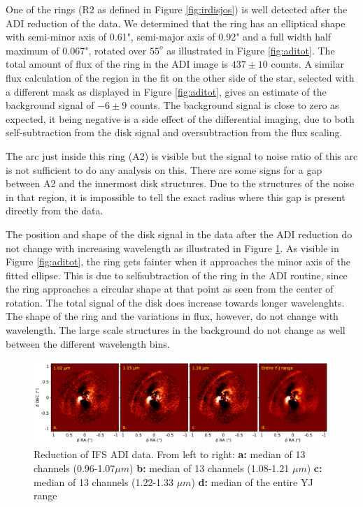 \documentclass[twoside,single,12pt]{lion-msc}
\begin{document}
One of the rings (R2 as defined in Figure \ref{fig:irdisjos}) is well detected after the ADI reduction of the data. We determined that the ring has an elliptical shape with semi-minor axis of 0.61", semi-major axis of 0.92" and a full width half maximum of 0.067", rotated over $55^o$ as illustrated in Figure \ref{fig:aditot}. The total amount of flux of the ring in the ADI image is $437\pm 10$ counts. A similar flux calculation of the region in the fit on the other side of the star, selected with a different mask as displayed in Figure \ref{fig:aditot}, gives an estimate of the background signal of $-6\pm 9$ counts. The background signal is close to zero as expected, it being negative is a side effect of the differential imaging, due to both self-subtraction from the disk signal and oversubtraction from the flux scaling. 
\bigskip

The arc just inside this ring (A2) is visible but the signal to noise ratio of this arc is not sufficient to do any analysis on this. There are some signs for a gap between A2 and the innermost disk structures. Due to the structures of the noise in that region, it is impossible to tell the exact radius where this gap is present directly from the data. 
\bigskip

The position and shape of the disk signal in the data after the ADI reduction do not change with increasing wavelength as illustrated in Figure \ref{fig:ADIcolor}. As visible in Figure \ref{fig:aditot}, the ring gets fainter when it approaches the minor axis of the fitted ellipse. This is due to selfsubtraction of the ring in the ADI routine, since the ring approaches a circular shape at that point as seen from the center of rotation. The total signal of the disk does increase towards longer wavelenghts. The shape of the ring and the variations in flux, however, do not change with wavelength. The large scale structures in the background do not change as well between the different wavelength bins.

\begin{figure}[htb]
\centering
\includegraphics[trim={0cm 0cm 0cm 0cm},clip,width = \textwidth]{ADIwavelplot}
\caption{Reduction of IFS ADI data. From left to right: \textbf{a:} median of 13 channels (0.96-1.07$\mu m$) \textbf{b:} median of 13 channels (1.08-1.21 $\mu m$) \textbf{c:} median of 13 channels (1.22-1.33 $\mu m$) \textbf{d:} median of the entire YJ range}
\label{fig:ADIcolor}
\end{figure}
\end{document}
